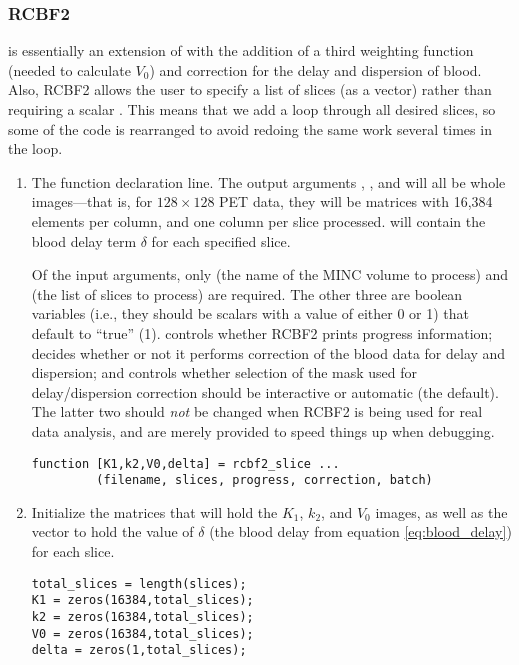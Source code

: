 \subsubsection{RCBF2}
\label{sec:rcbf2_listing}

 is essentially an extension of  with the
addition of a third weighting function (needed to calculate $V_0$) and
correction for the delay and dispersion of blood.  Also, RCBF2
allows the user to specify a list of slices (as a vector) rather than
requiring a scalar .  This means that we add a loop
through all desired slices, so some of the code is rearranged to avoid
redoing the same work several times in the loop.

\begin{enumerate}
\item The function declaration line.  The output arguments ,
  , and  will all be whole images---that is, for
  $128 \times 128$ PET data, they will be matrices with 16,384
  elements per column, and one column per slice processed.
   will contain the blood delay term $\delta$ for each
  specified slice.

  Of the input arguments, only  (the name of the MINC
  volume to process) and  (the list of slices to process)
  are required.  The other three are boolean variables (i.e., they
  should be scalars with a value of either 0 or 1) that default to
  ``true'' (1).   controls whether RCBF2 prints
  progress information;  decides whether or not it
  performs correction of the blood data for delay and dispersion; and
   controls whether selection of the mask used for
  delay/dispersion correction should be interactive or automatic (the
  default).  The latter two should {\em not} be changed when RCBF2 is
  being used for real data analysis, and are merely provided to speed
  things up when debugging.
  \begin{verbatim}
function [K1,k2,V0,delta] = rcbf2_slice ...
         (filename, slices, progress, correction, batch)
  \end{verbatim}

\item Initialize the matrices that will hold the $K_1$, $k_2$, and
  $V_0$ images, as well as the vector to hold the value of $\delta$
  (the blood delay from equation \ref{eq:blood_delay}) for each slice.
  \begin{verbatim}
total_slices = length(slices);
K1 = zeros(16384,total_slices);
k2 = zeros(16384,total_slices);
V0 = zeros(16384,total_slices);
delta = zeros(1,total_slices);
  \end{verbatim}


\end{enumerate}
